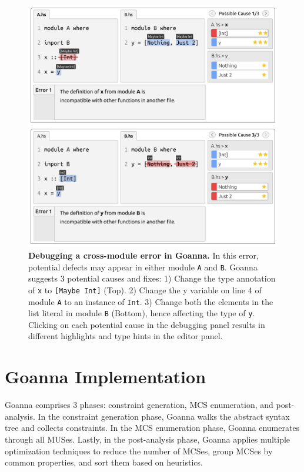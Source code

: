 \documentclass[pdflatex,lineno,sn-nature,Numbered]{sn-jnl}%
\begin{document}
    \begin{figure}[ht!]
        \centering
        \includegraphics[width=\linewidth]{images/goanna-cross-module}
        \caption[Debugging a cross-module error in Goanna]{\textbf{Debugging a cross-module error in Goanna.} In this error, potential defects may appear in either module \texttt{A} and \texttt{B}. Goanna suggests 3 potential causes and fixes: 1) Change the type annotation of \texttt{x} to \texttt{[Maybe Int]} (Top). 2) Change the y variable on line 4 of module \texttt{A} to an instance of \texttt{Int}. 3) Change both the elements in the list literal in module \texttt{B} (Bottom), hence affecting the type of \texttt{y}. Clicking on each potential cause in the debugging panel results in different highlights and type hints in the editor panel.}
        \label{fig:goanna-cross-module}
    \end{figure}


    \section{Goanna Implementation} \label{sec:implementation}
    Goanna comprises 3 phases: constraint generation, MCS enumeration, and post-analysis. In the constraint generation phase, Goanna walks the abstract syntax tree and collects constraints. In the MCS enumeration phase, Goanna enumerates through all MUSes. Lastly, in the post-analysis phase, Goanna applies multiple optimization techniques to reduce the number of MCSes, group MCSes by common properties, and sort them based on heuristics.
\end{document}
